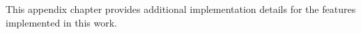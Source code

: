 
This appendix chapter provides additional implementation details for the features implemented in this work.
